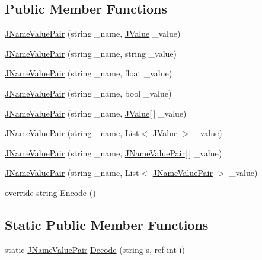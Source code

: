 \subsection*{Public Member Functions}
\begin{DoxyCompactItemize}
\item 
\hyperlink{class_disruptive_software_1_1_j_name_value_pair_a7851d04dabc36fc5c51991d1b7cd7a0a}{J\+Name\+Value\+Pair} (string \+\_\+name, \hyperlink{class_disruptive_software_1_1_j_value}{J\+Value} \+\_\+value)
\item 
\hyperlink{class_disruptive_software_1_1_j_name_value_pair_a651e5f9739d19e6c8dd1b1aa6d23f2ed}{J\+Name\+Value\+Pair} (string \+\_\+name, string \+\_\+value)
\item 
\hyperlink{class_disruptive_software_1_1_j_name_value_pair_a5494ce65a339d95e96db4a6d8dbaad4b}{J\+Name\+Value\+Pair} (string \+\_\+name, float \+\_\+value)
\item 
\hyperlink{class_disruptive_software_1_1_j_name_value_pair_afc5dda085c280e93cc2cbd935e87ba2d}{J\+Name\+Value\+Pair} (string \+\_\+name, bool \+\_\+value)
\item 
\hyperlink{class_disruptive_software_1_1_j_name_value_pair_ad9e54dc57fc33e2d2988a8fb23d58c8e}{J\+Name\+Value\+Pair} (string \+\_\+name, \hyperlink{class_disruptive_software_1_1_j_value}{J\+Value}\mbox{[}$\,$\mbox{]} \+\_\+value)
\item 
\hyperlink{class_disruptive_software_1_1_j_name_value_pair_a4d44e8664074d8e6c9b97106747bcecb}{J\+Name\+Value\+Pair} (string \+\_\+name, List$<$ \hyperlink{class_disruptive_software_1_1_j_value}{J\+Value} $>$ \+\_\+value)
\item 
\hyperlink{class_disruptive_software_1_1_j_name_value_pair_a56e6607e6a2b09b53d06f2881eec7c58}{J\+Name\+Value\+Pair} (string \+\_\+name, \hyperlink{class_disruptive_software_1_1_j_name_value_pair}{J\+Name\+Value\+Pair}\mbox{[}$\,$\mbox{]} \+\_\+value)
\item 
\hyperlink{class_disruptive_software_1_1_j_name_value_pair_ab5770e044e586e108af520943b24a65c}{J\+Name\+Value\+Pair} (string \+\_\+name, List$<$ \hyperlink{class_disruptive_software_1_1_j_name_value_pair}{J\+Name\+Value\+Pair} $>$ \+\_\+value)
\item 
override string \hyperlink{class_disruptive_software_1_1_j_name_value_pair_ac70a39d7943cb0a56330030545936bdd}{Encode} ()
\end{DoxyCompactItemize}
\subsection*{Static Public Member Functions}
\begin{DoxyCompactItemize}
\item 
static \hyperlink{class_disruptive_software_1_1_j_name_value_pair}{J\+Name\+Value\+Pair} \hyperlink{class_disruptive_software_1_1_j_name_value_pair_a810e9030c0eb61891175ed51231c69d4}{Decode} (string s, ref int i)
\end{DoxyCompactItemize}
